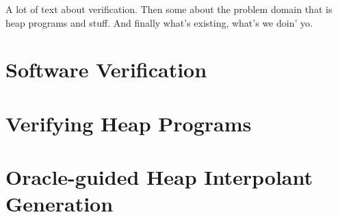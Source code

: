 \label{ch:intro}

A lot of text about verification. Then some about the problem domain that is heap programs and stuff. And finally what's existing, what's we doin' yo.

\section{Software Verification}

\section{Verifying Heap Programs}

\section{Oracle-guided Heap Interpolant Generation}